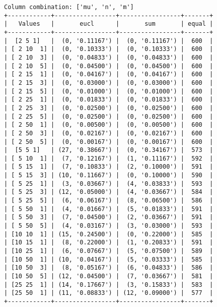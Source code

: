 \documentclass{article}
\begin{document}
\begin{verbatim}
Column combination: ['mu', 'n', 'm']
+------------+-----------------+-----------------+-------+
|   Values   |       eucl      |       sum       | equal |
+------------+-----------------+-----------------+-------+
|  [2 5 1]   |  (0, '0.11167') |  (0, '0.11167') |  600  |
| [ 2 10  1] |  (0, '0.10333') |  (0, '0.10333') |  600  |
| [ 2 10  3] |  (0, '0.04833') |  (0, '0.04833') |  600  |
| [ 2 10  5] |  (0, '0.04500') |  (0, '0.04500') |  600  |
| [ 2 15  1] |  (0, '0.04167') |  (0, '0.04167') |  600  |
| [ 2 15  3] |  (0, '0.03000') |  (0, '0.03000') |  600  |
| [ 2 15  5] |  (0, '0.01000') |  (0, '0.01000') |  600  |
| [ 2 25  1] |  (0, '0.01833') |  (0, '0.01833') |  600  |
| [ 2 25  3] |  (0, '0.02500') |  (0, '0.02500') |  600  |
| [ 2 25  5] |  (0, '0.02500') |  (0, '0.02500') |  600  |
| [ 2 50  1] |  (0, '0.00500') |  (0, '0.00500') |  600  |
| [ 2 50  3] |  (0, '0.02167') |  (0, '0.02167') |  600  |
| [ 2 50  5] |  (0, '0.00167') |  (0, '0.00167') |  600  |
|  [5 5 1]   | (27, '0.38667') |  (0, '0.34167') |  573  |
| [ 5 10  1] |  (7, '0.12167') |  (1, '0.11167') |  592  |
| [ 5 15  1] |  (7, '0.10833') |  (2, '0.10000') |  591  |
| [ 5 15  3] | (10, '0.11667') |  (0, '0.10000') |  590  |
| [ 5 25  1] |  (3, '0.03667') |  (4, '0.03833') |  593  |
| [ 5 25  3] | (12, '0.05000') |  (4, '0.03667') |  584  |
| [ 5 25  5] |  (6, '0.06167') |  (8, '0.06500') |  586  |
| [ 5 50  1] |  (4, '0.01667') |  (5, '0.01833') |  591  |
| [ 5 50  3] |  (7, '0.04500') |  (2, '0.03667') |  591  |
| [ 5 50  5] |  (4, '0.03167') |  (3, '0.03000') |  593  |
| [10 10  1] | (15, '0.24500') |  (0, '0.22000') |  585  |
| [10 15  1] |  (8, '0.22000') |  (1, '0.20833') |  591  |
| [10 25  1] |  (6, '0.07667') |  (5, '0.07500') |  589  |
| [10 50  1] | (10, '0.04167') |  (5, '0.03333') |  585  |
| [10 50  3] |  (8, '0.05167') |  (6, '0.04833') |  586  |
| [10 50  5] | (12, '0.04500') |  (7, '0.03667') |  581  |
| [25 25  1] | (14, '0.17667') |  (3, '0.15833') |  583  |
| [25 50  1] | (11, '0.08833') | (12, '0.09000') |  577  |
+------------+-----------------+-----------------+-------+
\end{verbatim}
\end{document}
